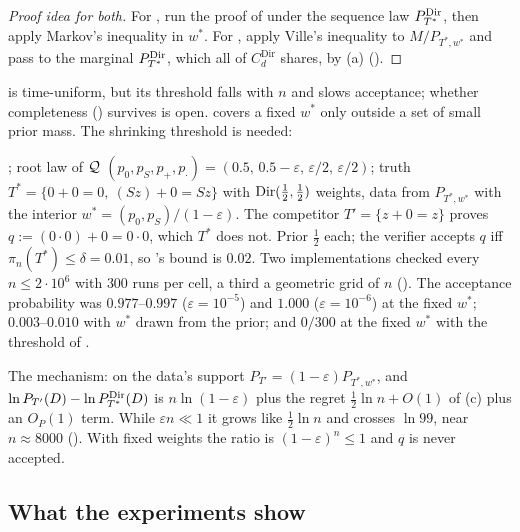 \begin{proof}[Proof idea for both]
For , run the proof of  under the sequence law $P^{\mathrm{Dir}}_{T^*}$, then apply Markov's inequality in $w^*$. For , apply Ville's inequality to $M/P_{T^*,w^*}$ and pass to the marginal $P^{\mathrm{Dir}}_{T^*}$, which all of $C^{\mathrm{Dir}}_d$ shares, by (a) ().
\end{proof}

 is time-uniform, but its threshold falls with $n$ and slows acceptance; whether completeness () survives is open.  covers a fixed $w^*$ only outside a set of small prior mass. The shrinking threshold is needed:

\begin{example}\label{ex:sound:constant}
\Lzero; root law of $\mathcal{Q}$ $(p_0,p_S,p_+,p_\cdot)=(0.5,\,0.5-\varepsilon,\,\varepsilon/2,\,\varepsilon/2)$; truth $T^*=\{0+0=0,\ (Sz)+0=Sz\}$ with $\mathrm{Dir}(\tfrac12,\tfrac12)$ weights, data from $P_{T^*,w^*}$ with the interior $w^*=(p_0,p_S)/(1-\varepsilon)$. The competitor $T'=\{z+0=z\}$ proves $q:=(0\cdot0)+0=0\cdot0$, which $T^*$ does not. Prior $\tfrac12$ each; the verifier accepts $q$ iff $\pi_n(T^*)\le\delta=0.01$, so 's bound is $0.02$. Two implementations checked every $n\le2\cdot10^6$ with $300$ runs per cell, a third a geometric grid of $n$ (). The acceptance probability was $0.977$--$0.997$ ($\varepsilon=10^{-5}$) and $1.000$ ($\varepsilon=10^{-6}$) at the fixed $w^*$; $0.003$--$0.010$ with $w^*$ drawn from the prior; and $0/300$ at the fixed $w^*$ with the threshold of .
\end{example}

The mechanism: on the data's support $P_{T'}=(1-\varepsilon)P_{T^*,w^*}$, and $\ln P_{T'}(D)-\ln P^{\mathrm{Dir}}_{T^*}(D)$ is $n\ln(1-\varepsilon)$ plus the regret $\tfrac12\ln n+O(1)$ of (c) plus an $O_P(1)$ term. While $\varepsilon n\ll1$ it grows like $\tfrac12\ln n$ and crosses $\ln99$, near $n\approx8000$ (). With fixed weights the ratio is $(1-\varepsilon)^n\le1$ and $q$ is never accepted.

\subsection{What the experiments show}\label{sec:sound:exp}

